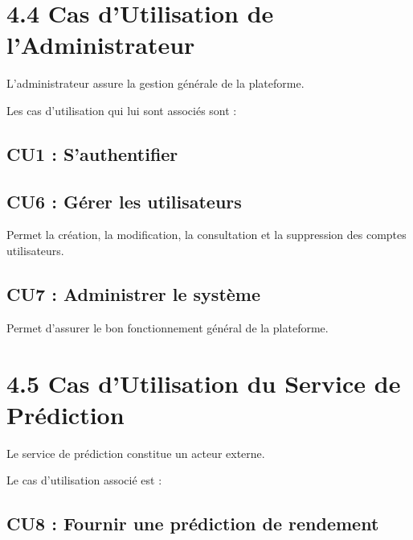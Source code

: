 \documentclass[
]{book}
\begin{document}
\hypertarget{cas-dutilisation-de-ladministrateur}{%
\section{4.4 Cas d'Utilisation de
l'Administrateur}\label{cas-dutilisation-de-ladministrateur}}

L'administrateur assure la gestion générale de la plateforme.

Les cas d'utilisation qui lui sont associés sont :

\hypertarget{cu1-sauthentifier-2}{%
\subsection{CU1 : S'authentifier}\label{cu1-sauthentifier-2}}

\hypertarget{cu6-guxe9rer-les-utilisateurs}{%
\subsection{CU6 : Gérer les
utilisateurs}\label{cu6-guxe9rer-les-utilisateurs}}

Permet la création, la modification, la consultation et la suppression
des comptes utilisateurs.

\hypertarget{cu7-administrer-le-systuxe8me}{%
\subsection{CU7 : Administrer le
système}\label{cu7-administrer-le-systuxe8me}}

Permet d'assurer le bon fonctionnement général de la plateforme.

\hypertarget{cas-dutilisation-du-service-de-pruxe9diction}{%
\section{4.5 Cas d'Utilisation du Service de
Prédiction}\label{cas-dutilisation-du-service-de-pruxe9diction}}

Le service de prédiction constitue un acteur externe.

Le cas d'utilisation associé est :

\hypertarget{cu8-fournir-une-pruxe9diction-de-rendement}{%
\subsection{CU8 : Fournir une prédiction de
rendement}\label{cu8-fournir-une-pruxe9diction-de-rendement}}
\end{document}
